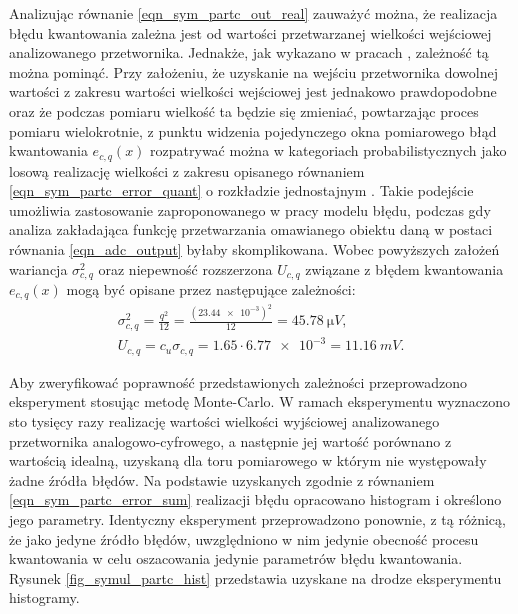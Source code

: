 Analizując równanie \eqref{eqn_sym_partc_out_real} zauważyć można, że realizacja błędu kwantowania zależna jest od wartości przetwarzanej wielkości wejściowej analizowanego przetwornika. Jednakże, jak wykazano w pracach \cite{sienkowski_kwant, sienkowski_adc}, zależność tą można pominąć. Przy założeniu, że uzyskanie na wejściu przetwornika dowolnej wartości z zakresu wartości wielkości wejściowej jest jednakowo prawdopodobne oraz że podczas pomiaru wielkość ta będzie się zmieniać, powtarzając proces pomiaru wielokrotnie, z punktu widzenia pojedynczego okna pomiarowego błąd kwantowania $e_{c,q}(x)$ rozpatrywać można w kategoriach probabilistycznych jako losową realizację wielkości z zakresu opisanego równaniem \eqref{eqn_sym_partc_error_quant} o rozkładzie jednostajnym \cite{jakubiec_system}. Takie podejście umożliwia zastosowanie zaproponowanego w pracy modelu błędu, podczas gdy analiza zakładająca funkcję przetwarzania omawianego obiektu daną w postaci równania \eqref{eqn_adc_output} byłaby skomplikowana. Wobec powyższych założeń wariancja $\sigma_{c,q}^{2}$ oraz niepewność rozszerzona $U_{c,q}$ związane z błędem kwantowania $e_{c,q}(x)$ mogą być opisane przez następujące zależności:
\begin{gather}
\sigma_{c,q}^{2} = \frac{ q^{2}}{12} = \frac{ \left( \num{23.44e-3} \right)^{2} }{12} = \qty{45.78}{\micro V} \label{eqn_sym_partc_var_quant}, \\
U_{c,q} = c_{u} \sigma_{c,q} = 1.65 \cdot \num{6.77e-3} = \qty{11.16}{mV} \label{eqn_sym_partc_uncert_quant}.
\end{gather}

Aby zweryfikować poprawność przedstawionych zależności przeprowadzono eksperyment stosując metodę Monte-Carlo. W ramach eksperymentu wyznaczono sto tysięcy razy realizację wartości wielkości wyjściowej analizowanego przetwornika analogowo-cyfrowego, a następnie jej wartość porównano z wartością idealną, uzyskaną dla toru pomiarowego w którym nie występowały żadne źródła błędów. Na podstawie uzyskanych zgodnie z równaniem \eqref{eqn_sym_partc_error_sum} realizacji błędu opracowano histogram i określono jego parametry. Identyczny eksperyment przeprowadzono ponownie, z tą różnicą, że jako jedyne źródło błędów, uwzględniono w nim jedynie obecność procesu kwantowania w celu oszacowania jedynie parametrów błędu kwantowania. Rysunek \ref{fig_symul_partc_hist} przedstawia uzyskane na drodze eksperymentu histogramy.

